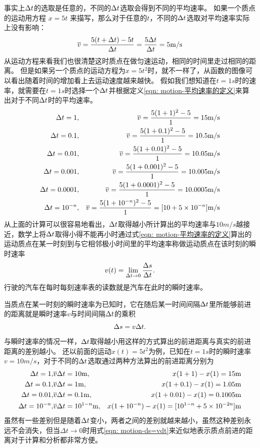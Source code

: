 事实上$\Delta t$的选取是任意的，不同的$\Delta t$选取会得到不同的平均速率。
如果一个质点的运动用方程 $x=5t$ 来描写，那么对于任意的$t$，不同的$\Delta t$选取对平均速率实际上没有影响：
\begin{equation}
\overline{v} = \frac{5(t+\Delta t)-5t}{\Delta t} = \frac{5\Delta t}{\Delta t} = 5{\rm{m/s}}
\end{equation}
从运动方程来看我们也很清楚这时质点在做匀速运动，相同的时间里走过相同的距离。
但是如果另一个质点的运动方程为$x=5t^2$时，就不一样了，从函数的图像可以看出随着时间的增加看上去运动速度越来越快。
假如我们想知道在$t=1\unit{s}$时的速率，就需要在$t=1\unit{s}$时选择一个$\Delta t$并根据定义\ref{eqn: motion-平均速率的定义}来算出对于不同$\Delta t$时的平均速率。
\begin{eqnarray*}
\Delta t = 1&,&\overline{v} = \frac{5(1+1)^2-5}{1} = 15{\rm{m/s}}\\
\Delta t = 0.1&,&\overline{v} = \frac{5(1+0.1)^2-5}{1} = 10.5{\rm{m/s}}\\
\Delta t = 0.01&,&\overline{v} = \frac{5(1+0.01)^2-5}{1} = 10.05{\rm{m/s}}\\
\Delta t = 0.001&,&\overline{v} = \frac{5(1+0.001)^2-5}{1} = 10.005{\rm{m/s}}\\
\Delta t = 0.0001&,&\overline{v} = \frac{5(1+0.0001)^2-5}{1} = 10.0005{\rm{m/s}}\\
\Delta t = 10^{-n}&,&\overline{v} = \frac{5(1+10^{-n})^2-5}{1} = [10+5\times 10^{-n}]{\rm{m/s}} 
\end{eqnarray*}
从上面的计算可以很容易地看出，$\Delta t$取得越小所计算出的平均速率与$10\unit{m/s}$越接近，数学上将$\Delta t$取得小得不能再小时通过式\ref{eqn: motion-平均速率的定义}算出的运动质点在某一时刻到与它相邻极小时间里的平均速率称做运动质点在该时刻的{\heiti 瞬时速率}
\begin{equation}
v(t) = \lim_{\Delta t\rightarrow 0}\frac{\Delta s}{\Delta t}.
\end{equation}
行驶的汽车在每时每刻速率表的读数就是汽车在此时的瞬时速率。

当质点在某一时刻的瞬时速率为已知时，它在随后某一时间间隔$\Delta t$里所能够前进的距离就是瞬时速率$v$与时间间隔$\Delta t$的乘积
\begin{equation}\label{eqn: motion-ds=vdt}
\Delta s = v \Delta t.
\end{equation}
与瞬时速率的情况一样，$\Delta t$取得越小用这样的方式算出的前进距离与真实的前进距离的差别越小。
还以前面的运动$x(t)=5t^2$为例，已知在$t=1\unit{s}$时的瞬时速率$v = 10\unit{m/s}$，对于不同的$\Delta t$选取通过两种方法算出的前进距离分别为
\begin{eqnarray*}
\Delta t = 1,& \overline{v}\Delta t = 10{\rm{m}},&x(1+1)-x(1) = 15{\rm{m}}\\
\Delta t = 0.1,& \overline{v}\Delta t = 1{\rm{m}},&x(1+0.1)-x(1) = 1.05{\rm{m}}\\
\Delta t = 0.01,& \overline{v}\Delta t = 0.1{\rm{m}},&x(1+0.01)-x(1) = 0.1005{\rm{m}}\\
\Delta t = 10^{-n},& \overline{v}\Delta t = 10^{1-n}{\rm{m}},&x(1+10^{-n})-x(1) = [10^{1-n}+5\times 10^{-2n}]{\rm{m}}\\
\end{eqnarray*}
虽然有一些差别但是随着$\Delta t$变小，两者之间的差别就越来越小，虽然这种差别永远不会消失，但当$\Delta t\rightarrow 0$时用式\ref{eqn: motion-ds=vdt}来近似地表示质点前进的距离对于计算和分析都非常方便。


